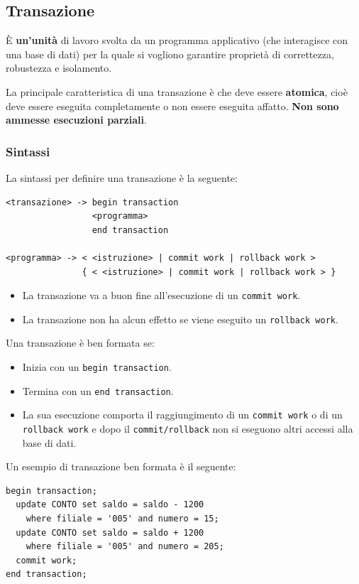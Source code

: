 \documentclass[a4paper]{article}
\begin{document}
\subsection{Transazione}
\begin{definition}
  È \textbf{un’unità} di lavoro svolta da un programma applicativo (che interagisce con una base
  di dati) per la quale si vogliono garantire proprietà di correttezza, robustezza e
  isolamento.
\end{definition}
La principale caratteristica di una transazione è che deve essere \textbf{atomica}, cioè
deve essere eseguita completamente o non essere eseguita affatto. \textbf{Non sono
ammesse esecuzioni parziali}.

\subsubsection{Sintassi}
La sintassi per definire una transazione è la seguente:
\begin{lstlisting}
<transazione> -> begin transaction
                 <programma>
                 end transaction

<programma> -> < <istruzione> | commit work | rollback work >
               { < <istruzione> | commit work | rollback work > }
\end{lstlisting}
\begin{itemize}
  \item La transazione va a buon fine all'esecuzione di un \texttt{commit work}.
  \item La transazione non ha alcun effetto se viene eseguito un \texttt{rollback work}.
\end{itemize}

\vspace{1em}
\noindent
Una transazione è ben formata se:
\begin{itemize}
  \item Inizia con un \texttt{begin transaction}.
  \item Termina con un \texttt{end transaction}.
  \item La sua esecuzione comporta il raggiungimento di un \texttt{commit work} o di un
    \texttt{rollback work} e dopo il \texttt{commit/rollback} non si eseguono altri
    accessi alla base di dati.
\end{itemize}

\begin{example}
  Un esempio di transazione ben formata è il seguente:
\begin{lstlisting}
begin transaction;
  update CONTO set saldo = saldo - 1200
    where filiale = '005' and numero = 15;
  update CONTO set saldo = saldo + 1200
    where filiale = '005' and numero = 205;
  commit work;
end transaction;
\end{lstlisting}
\end{example}
\end{document}
